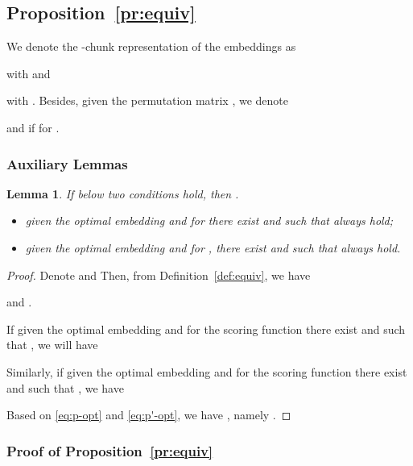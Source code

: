 \documentclass[10pt,journal,compsoc]{IEEEtran}
\newtheorem{lemma}{Lemma}
\begin{document}
\subsection{Proposition~\ref{pr:equiv}}
\label{app:equiv}

We denote the -chunk representation of the embeddings as 

with 
and 

with .
Besides,
given the permutation matrix ,
we denote 
 
and 
if  
for .

\subsubsection{Auxiliary Lemmas}


\begin{lemma}
\label{lem:optimal}
If below two conditions hold,
then .
\begin{itemize}[leftmargin=*]
\item given the optimal embedding 
 and  for 
there exist  and  such that  always hold;

\item 
given the optimal embedding 
 and  for ,
there exist  and  such that  always hold.
\end{itemize}
\end{lemma}

\begin{proof}
	Denote 
	and 	
	Then, 
	from Definition~\ref{def:equiv},
	we have 
	
	and 
	     .
	
	If given the optimal embedding 
	 and  for the scoring function 
	there exist  and  such that ,
	we will have
	
	
	Similarly,
	if given the optimal embedding 
	 and  for the scoring function 
	there exist  and  such that ,
	we have
	
	Based on \eqref{eq:p-opt} and \eqref{eq:p'-opt},
	we have ,
	namely .
\end{proof}


\subsubsection{Proof of Proposition~\ref{pr:equiv}}
\end{document}
